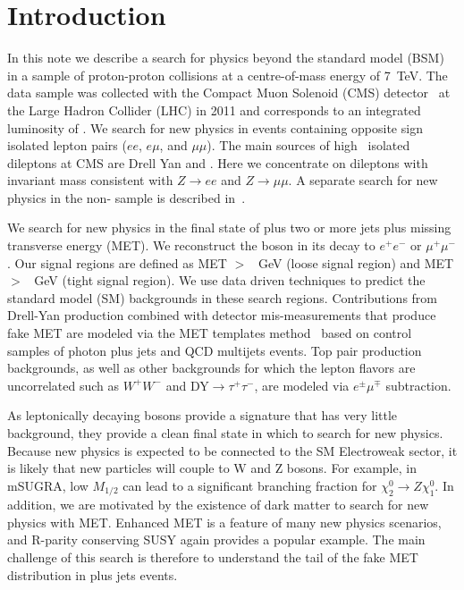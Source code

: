 
\section{Introduction}

In this note we describe a search for physics beyond the standard model (BSM) 
in a sample of proton-proton collisions at a centre-of-mass energy of 7~TeV. 
The data sample was collected with the Compact Muon Solenoid (CMS) detector~\cite{JINST} at 
the Large Hadron Collider (LHC) in 2011
and corresponds to an integrated luminosity of \lumi.
We search for new physics in events containing
opposite sign isolated lepton pairs ($ee$, $e\mu$, and $\mu\mu$).
The main sources of high \pt\ isolated dileptons at CMS are Drell Yan and \ttbar.
Here we concentrate on dileptons with invariant mass consistent
with $Z \to ee$ and $Z \to \mu\mu$.  A separate search for new physics in the non-\Z
sample is described in~\cite{ref:ospaper}.

We search for new physics in the final state of \Z plus two or more jets plus missing 
transverse energy (MET). We reconstruct the \Z boson
in its decay to $e^+e^-$ or $\mu^+\mu^-$. Our signal regions are defined as 
MET $>$ \signalmetl~GeV (loose signal region) and MET $>$ \signalmett~GeV 
(tight signal region). We use data driven techniques to predict the
standard model (SM) backgrounds in these search regions. 
Contributions from Drell-Yan production combined with detector mis-measurements that 
produce fake MET are modeled via the MET templates  method~\cite{ref:templates1,ref:templates2}
based on control samples of photon plus jets and QCD multijets events.
Top pair production backgrounds, as well as other backgrounds for which the lepton
flavors are uncorrelated such as $W^+W^-$ and DY$\rightarrow\tau^+\tau^-$, are 
modeled via $e^\pm\mu^\mp$ subtraction.

As leptonically decaying \Z bosons provide a signature that has very little background, 
they provide a clean final state in which to search for new physics. 
Because new physics is expected to be connected to the SM Electroweak sector, 
it is likely that new particles will couple to W and Z bosons. 
For example, in mSUGRA, low $M_{1/2}$ can lead to a significant branching fraction 
for $\chi_2^0 \rightarrow Z \chi_1^0$. 
In addition, we are motivated by the existence of dark matter to search for new physics with MET.
Enhanced MET is a feature of many new physics scenarios, and R-parity conserving SUSY 
again provides a popular example. The main challenge of this search is therefore to 
understand the tail of the fake MET distribution in \Z plus jets events.

